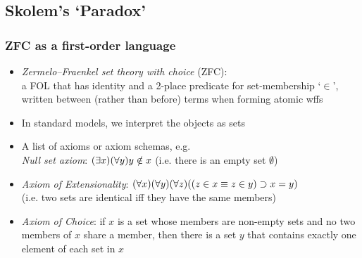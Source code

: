 \fi 



\subsection{Skolem's `Paradox'}

\begin{frame}
\frametitle{ZFC as a first-order language}

\begin{itemize}[<+->]

\item \emph{Zermelo--Fraenkel set theory with choice} (ZFC): \\ a FOL  that has identity and a 2-place predicate for set-membership `$\in$', written between (rather than before) terms when forming atomic wffs

\item In standard models, we interpret the objects as sets

\item A list of axioms or axiom schemas, e.g.\\  \textit{Null set axiom}: $(\exists x)(\forall y) y \notin x$ (i.e. there is an empty set $\emptyset$)


\item[] \textit{Axiom of Extensionality}: $(\forall x)(\forall y)(\forall z)( (z \in x \equiv z \in y) \supset x=y)$ \\ (i.e. two sets are identical iff they have the same members)

\item \emph{Axiom of Choice}: if $x$ is a set whose members are non-empty sets and no two members of $x$ share a member, then there is a set $y$ that contains exactly one element of each set in $x$ 


\end{itemize}
\end{frame}


